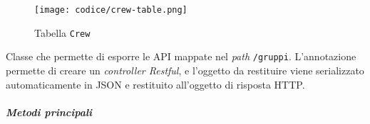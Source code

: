 \begin{figure}[H]
    \centerline{\texttt{[image: codice/crew-table.png]}}
    \caption{Tabella \texttt{Crew}}
    \label{img:Crew-tabella}
\end{figure}




\label{par:GruppiController}
Classe che permette di esporre le \gls{API} mappate nel \textit{path} \texttt{/gruppi}. 
L'annotazione  permette di creare un \textit{controller Restful}, e l'oggetto da restituire viene serializzato automaticamente in JSON e restituito all'oggetto di risposta HTTP.
\subparagraph*{Metodi principali}
